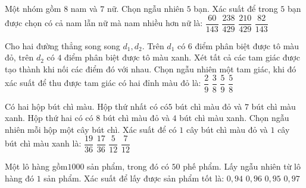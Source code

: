 \begin{ex}
Một nhóm gồm $8$ nam và $7$ nữ. Chọn ngẫu nhiên $5$ bạn. Xác suất để trong $5$ bạn được chọn có cả nam lẫn nữ mà nam nhiều hơn nữ là:
\choice
{$\dfrac{60}{143}$}
{\True $\dfrac{238}{429}$}
{$\dfrac{210}{429}$}
{$\dfrac{82}{143}$}
\end{ex}
\begin{ex}
Cho hai đường thẳng song song $d_1,d_2$. Trên $d_1$ có $6$ điểm phân biệt được tô màu đỏ, trên $d_2$ có $4$ điểm phân biệt được tô màu xanh. Xét tất cả các tam giác được tạo thành khi nối các điểm đó với nhau. Chọn ngẫu nhiên một tam giác, khi đó xác suất để thu được tam giác có hai đỉnh màu đỏ là:
\choice
{$\dfrac{2}{9}$}
{$\dfrac{3}{8}$}
{$\dfrac{5}{9}$}
{\True $\dfrac{5}{8}$}
\end{ex}
\begin{ex}
Có hai hộp bút chì màu. Hộp thứ nhất có có$5$ bút chì màu đỏ và $7$ bút chì màu xanh. Hộp thứ hai có có $8$ bút chì màu đỏ và $4$ bút chì màu xanh. Chọn ngẫu nhiên mỗi hộp một cây bút chì. Xác suất để có $1$ cây bút chì màu đỏ và $1$ cây bút chì màu xanh là:
\choice
{\True $\dfrac{19}{36}$}
{$\dfrac{17}{36}$}
{$\dfrac{5}{12}$}
{$\dfrac{7}{12}$}
\end{ex}
\begin{ex}
Một lô hàng gồm$1000$ sản phẩm, trong đó có $50$ phế phẩm. Lấy ngẫu nhiên từ lô hàng đó $1$ sản phẩm. Xác suất để lấy được sản phẩm tốt là:
\choice
{$0{,}94$}
{$0{,}96$}
{\True $0{,}95$}
{$0{,}97$}
\end{ex}
